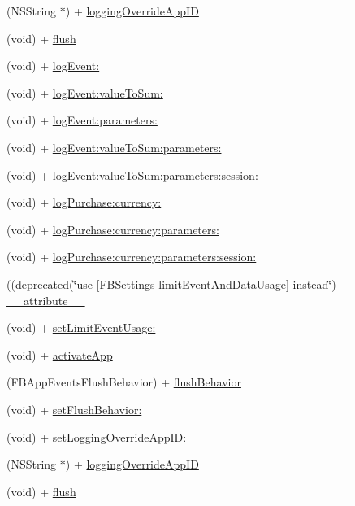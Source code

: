 \begin{DoxyCompactItemize}
(N\+S\+String $\ast$) + \hyperlink{interfaceFBAppEvents_a1aa76011dcc7ab662780b05cfcc65f38}{logging\+Override\+App\+ID}
\item 
(void) + \hyperlink{interfaceFBAppEvents_a0475c0b929152f9be2b7428312382747}{flush}
\item 
(void) + \hyperlink{interfaceFBAppEvents_a816373dd50bcf7381bf8194758ef8441}{log\+Event\+:}
\item 
(void) + \hyperlink{interfaceFBAppEvents_a9ac18622973fab340ecf25c63c933a34}{log\+Event\+:value\+To\+Sum\+:}
\item 
(void) + \hyperlink{interfaceFBAppEvents_a68b55bf0f5695fdf0089326473fcf4ea}{log\+Event\+:parameters\+:}
\item 
(void) + \hyperlink{interfaceFBAppEvents_a97a4a0a626b52abef16bdb3ea046b89e}{log\+Event\+:value\+To\+Sum\+:parameters\+:}
\item 
(void) + \hyperlink{interfaceFBAppEvents_a53a76d8d2b1245932bc89d55cdd247fa}{log\+Event\+:value\+To\+Sum\+:parameters\+:session\+:}
\item 
(void) + \hyperlink{interfaceFBAppEvents_a871b481d919104f7dbb67247b682e0fa}{log\+Purchase\+:currency\+:}
\item 
(void) + \hyperlink{interfaceFBAppEvents_aa77be4e60be97432ca9f6e3afe8d7b7f}{log\+Purchase\+:currency\+:parameters\+:}
\item 
(void) + \hyperlink{interfaceFBAppEvents_a96a5a1507cf439301bf5330339999777}{log\+Purchase\+:currency\+:parameters\+:session\+:}
\item 
((deprecated(\char`\"{}use \mbox{[}\hyperlink{interfaceFBSettings}{F\+B\+Settings} limit\+Event\+And\+Data\+Usage\mbox{]} instead\char`\"{}) + \hyperlink{interfaceFBAppEvents_a395c574fef6bbde5ac4b98b6cf497b8c}{\+\_\+\+\_\+attribute\+\_\+\+\_\+}
\item 
(void) + \hyperlink{interfaceFBAppEvents_a35ba571c101d4c2a051583f59ad433ab}{set\+Limit\+Event\+Usage\+:}
\item 
(void) + \hyperlink{interfaceFBAppEvents_a440fe60c1685ab36053ba18a190dd82e}{activate\+App}
\item 
(F\+B\+App\+Events\+Flush\+Behavior) + \hyperlink{interfaceFBAppEvents_af9b7ac67d5b3587f7dc452ba2129fe85}{flush\+Behavior}
\item 
(void) + \hyperlink{interfaceFBAppEvents_a0c6f0d165c7fba6eab71ff3228e9b848}{set\+Flush\+Behavior\+:}
\item 
(void) + \hyperlink{interfaceFBAppEvents_a3f9d06a1e8b3d482efc5c438827fbc6e}{set\+Logging\+Override\+App\+I\+D\+:}
\item 
(N\+S\+String $\ast$) + \hyperlink{interfaceFBAppEvents_a1aa76011dcc7ab662780b05cfcc65f38}{logging\+Override\+App\+ID}
\item 
(void) + \hyperlink{interfaceFBAppEvents_a0475c0b929152f9be2b7428312382747}{flush}
\end{DoxyCompactItemize}



